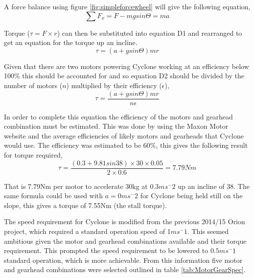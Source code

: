A force balance using figure \ref{fig:simpleforcewheel} will give the following equation,
\begin{equation}
\sum F_x=F-mgsin\Theta = ma
\end{equation}

Torque ($\tau=F \times r$) can then be substituted into equation D1 and rearranged to get an equation for the torque up an incline.
\begin{equation}
\tau=(a+gsin\Theta)mr
\end{equation}

Given that there are two motors powering Cyclone working at an efficiency below 100\% this should be accounted for and so equation D2 should be divided by the number of motors ($n$) multiplied by their efficiency ($\epsilon$),
\begin{equation}
\tau= \frac{(a+gsin\Theta)mr}{n \epsilon}
\end{equation}

In order to complete this equation the efficiency of the motors and gearhead combination must be estimated. This was done by using the Maxon Motor website and the average efficiencies of likely motors and gearheads that Cyclone would use. The efficiency was estimated to be 60\%, this gives the following result for torque required,
\begin{equation}
\tau= \frac{(0.3+9.81sin38) \times 30 \times 0.05}{2 \times 0.6} = 7.79 Nm
\end{equation}

That is 7.79Nm per motor to accelerate 30kg at 0.3$ms^-2$ up an incline of 38\textordmasculine. The same formula could be used with $a=0 ms^-2$ for Cyclone being held still on the slope, this gives a torque of 7.55Nm (the stall torque).\par

The speed requirement for Cyclone is modified from the previous 2014/15 Orion project, which required a standard operation speed of 1$ms^-1$. This seemed ambitious given the motor and gearhead combinations available and their torque requirement. This prompted the speed requirement to be lowered to $0.5ms^-1$ standard operation, which is more achievable. From this information five motor and gearhead combinations were selected outlined in table \ref{tab:MotorGearSpec}.\par

